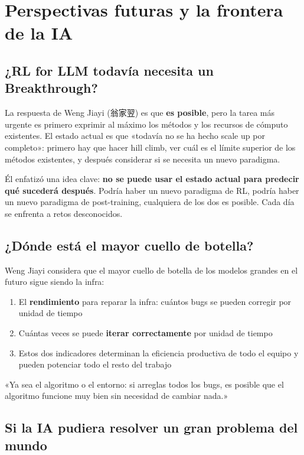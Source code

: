 \section{Perspectivas futuras y la frontera de la IA}

\subsection{¿RL for LLM todavía necesita un Breakthrough?}

La respuesta de Weng Jiayi (翁家翌) es que \textbf{es posible}, pero la tarea más urgente es primero exprimir al máximo los métodos y los recursos de cómputo existentes. El estado actual es que «todavía no se ha hecho scale up por completo»: primero hay que hacer hill climb, ver cuál es el límite superior de los métodos existentes, y después considerar si se necesita un nuevo paradigma.

Él enfatizó una idea clave: \textbf{no se puede usar el estado actual para predecir qué sucederá después}. Podría haber un nuevo paradigma de RL, podría haber un nuevo paradigma de post-training, cualquiera de los dos es posible. Cada día se enfrenta a retos desconocidos.

\subsection{¿Dónde está el mayor cuello de botella?}

Weng Jiayi considera que el mayor cuello de botella de los modelos grandes en el futuro sigue siendo la infra:

\begin{enumerate}
    \item El \textbf{rendimiento} para reparar la infra: cuántos bugs se pueden corregir por unidad de tiempo
    \item Cuántas veces se puede \textbf{iterar correctamente} por unidad de tiempo
    \item Estos dos indicadores determinan la eficiencia productiva de todo el equipo y pueden potenciar todo el resto del trabajo
\end{enumerate}

«Ya sea el algoritmo o el entorno: si arreglas todos los bugs, es posible que el algoritmo funcione muy bien sin necesidad de cambiar nada.»

\subsection{Si la IA pudiera resolver un gran problema del mundo}

